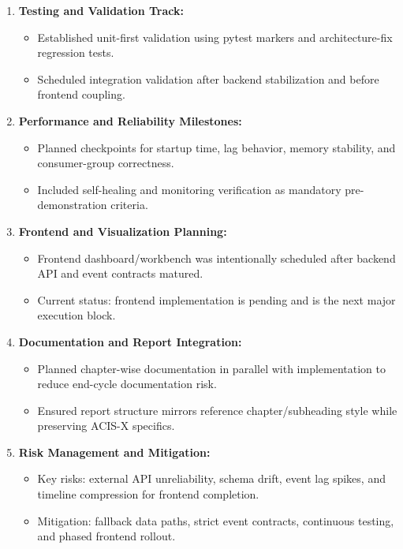 \documentclass[a4paper, 12pt]{report}
\begin{document}
\begin{enumerate}[itemsep=-4pt, label=\textbf{\roman*.}, itemsep=\parskip, parsep=0pt]
    \item \textbf{Testing and Validation Track: }
    \vspace{-4pt}
    \begin{itemize}[itemsep=-4pt]
        \item Established unit-first validation using pytest markers and architecture-fix regression tests.
        \item Scheduled integration validation after backend stabilization and before frontend coupling.
    \end{itemize}

    \item \textbf{Performance and Reliability Milestones: }
    \vspace{-4pt}
    \begin{itemize}[itemsep=-4pt]
        \item Planned checkpoints for startup time, lag behavior, memory stability, and consumer-group correctness.
        \item Included self-healing and monitoring verification as mandatory pre-demonstration criteria.
    \end{itemize}

    \item \textbf{Frontend and Visualization Planning: }
    \vspace{-4pt}
    \begin{itemize}[itemsep=-4pt]
        \item Frontend dashboard/workbench was intentionally scheduled after backend API and event contracts matured.
        \item Current status: frontend implementation is pending and is the next major execution block.
    \end{itemize}

    \item \textbf{Documentation and Report Integration: }
    \vspace{-4pt}
    \begin{itemize}[itemsep=-4pt]
        \item Planned chapter-wise documentation in parallel with implementation to reduce end-cycle documentation risk.
        \item Ensured report structure mirrors reference chapter/subheading style while preserving ACIS-X specifics.
    \end{itemize}

    \item \textbf{Risk Management and Mitigation: }
    \vspace{-4pt}
    \begin{itemize}[itemsep=-4pt]
        \item Key risks: external API unreliability, schema drift, event lag spikes, and timeline compression for frontend completion.
        \item Mitigation: fallback data paths, strict event contracts, continuous testing, and phased frontend rollout.
    \end{itemize}


\end{enumerate}
\end{document}
